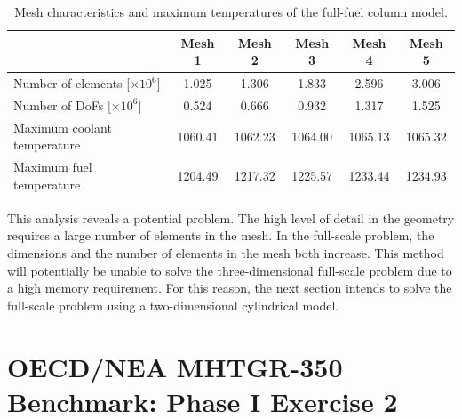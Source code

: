\begin{table}[htbp!]
  \centering
  \caption{Mesh characteristics and maximum temperatures of the full-fuel column model.}
  \label{tab:th-full-assem-results}
\begin{tabular}{lccccc}
\toprule
                            & Mesh 1 & Mesh 2 & Mesh 3 & Mesh 4 & Mesh 5 \\
\midrule
Number of elements [$\times 10^{6}$]  & 1.025 & 1.306 & 1.833 & 2.596 & 3.006 \\
Number of DoFs [$\times 10^{6}$]      & 0.524 & 0.666 & 0.932 & 1.317 & 1.525 \\
Maximum coolant temperature & 1060.41 & 1062.23 & 1064.00 & 1065.13 & 1065.32 \\
Maximum fuel temperature    & 1204.49 & 1217.32 & 1225.57 & 1233.44 & 1234.93 \\
\bottomrule
\end{tabular}
\end{table}

This analysis reveals a potential problem.
The high level of detail in the geometry requires a large number of elements in the mesh.
In the full-scale problem, the dimensions and the number of elements in the mesh both increase.
This method will potentially be unable to solve the three-dimensional full-scale problem due to a high memory requirement.
For this reason, the next section intends to solve the full-scale problem using a two-dimensional cylindrical model.



\section{OECD/NEA MHTGR-350 Benchmark: Phase I Exercise 2}
\label{sec:ph1ex2}

